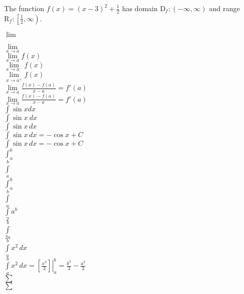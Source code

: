 \documentclass[11pt]{article}
\begin{document}
The function $f(x)=(x-3)^2+\frac{1}{2}$ has domain $\mathrm{D}_f:(-\infty,\infty)$ and range $\mathrm{R}_f:\left[\frac{1}{2},\infty\right)$.

$\lim$

$\lim\limits_{x \to a}$\\

$\lim\limits_{x \to a}f(x)$\\

$\lim\limits_{x \to a^-}f(x)$\\

$\lim\limits_{x \to a^+}f(x)$\\

$\lim\limits_{x \to a}\frac{f(x)-f(a)}{x-a}=f'(a)$\\

$\displaystyle{\lim\limits_{x \to a}\frac{f(x)-f(a)}{x-a}=f'(a)}$\\

$\int \sin x dx$\\

$\int \sin x\ dx$\\

$\int \sin x\,dx$\\

$\int \sin x\,dx=-\cos x+C$\\

$\displaystyle{\int \sin x\,dx=-\cos x+C}$\\

$\int_a^b$\\

$\int\limits_a^b$\\

$\displaystyle{\int_a^b}$\\

$\displaystyle{\int\limits_a^b}$\\

$\displaystyle{\int\limits_2a^b}$\\

$\displaystyle{\int\limits_{2a}^{b}}$\\

$\displaystyle{\int\limits_{a}^{b}x^2 \,dx}$\\

$\displaystyle{\int\limits_{a}^{b}x^2 \,dx=\left.\left[\frac{x^3}{3}\right]\right|_{a}^{b}=\frac{b^3}{3}-\frac{a^3}{3}}$\\

$\sum$\\

$\displaystyle{\sum}$\\
\end{document}
